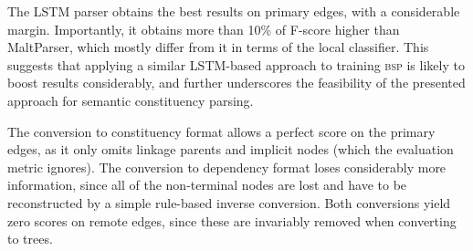 \documentclass[11pt]{article}
\begin{document}
The LSTM parser obtains the best results on primary edges,
with a considerable margin. Importantly, it obtains more than
10\% of F-score higher than MaltParser, which mostly differ
from it in terms of the local classifier.
This suggests that applying a similar LSTM-based approach to
training \textsc{bsp} is likely to boost results considerably,
and further underscores the feasibility
of the presented approach for semantic constituency parsing. 



The conversion to constituency format allows a perfect score on the
primary edges, as it only omits linkage parents and implicit nodes (which the evaluation metric ignores).
The conversion to dependency format loses considerably more information, since all of the non-terminal nodes are lost and have to be reconstructed by a simple rule-based inverse conversion.
Both conversions yield zero scores on remote edges, since these are invariably removed when converting to trees.
\end{document}
